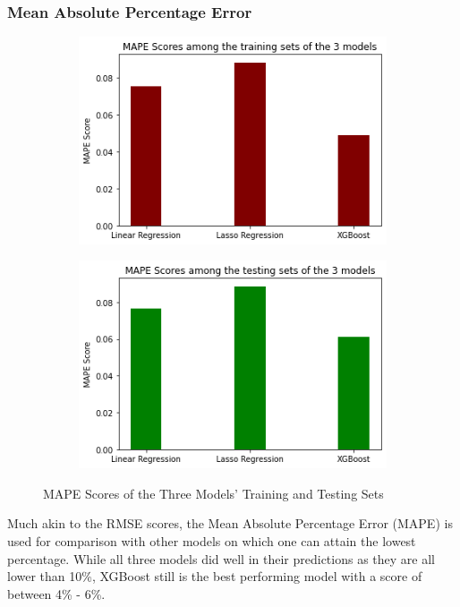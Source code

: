 \documentclass[runningheads]{llncs}
\begin{document}
\subsubsection{Mean Absolute Percentage Error}
\;
\begin{figure}
	\begin{subfigure}{.5\textwidth}
		\centering
		\includegraphics[width=.8\linewidth]{FIGURES/train_MAPE.png}
		
	\end{subfigure}%
	\begin{subfigure}{.5\textwidth}
		\centering
		\includegraphics[width=.8\linewidth]{FIGURES/test_MAPE.png}
		
	\end{subfigure}
	\caption{MAPE Scores of the Three Models’ Training and Testing Sets}
\end{figure}

Much akin to the RMSE scores, the Mean Absolute Percentage Error (MAPE) is used for comparison with other models on which one can attain the lowest percentage. While all three models did well in their predictions as they are all lower than 10\%, XGBoost still is the best performing model with a score of between 4\% - 6\%.
\end{document}
